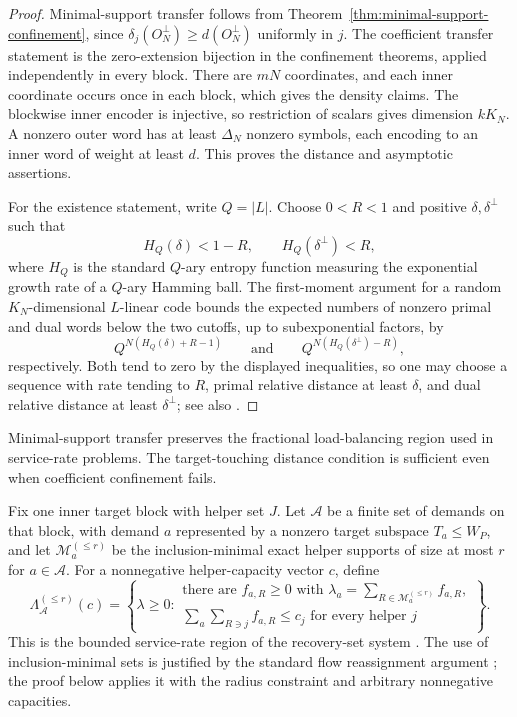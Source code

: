 \begin{proof}
Minimal-support transfer follows from
Theorem~\ref{thm:minimal-support-confinement}, since
$\delta_j(O_N^\perp)\geq d(O_N^\perp)$ uniformly in $j$.
The coefficient transfer statement is the zero-extension bijection in the confinement
theorems, applied independently in every block.  There are $mN$ coordinates,
and each inner coordinate occurs once in each block, which gives the density
claims.  The blockwise inner encoder is injective, so restriction of scalars
gives dimension $kK_N$.  A nonzero outer word has at least $\Delta_N$ nonzero
symbols, each encoding to an inner word of weight at least $d$.  This proves
the distance and asymptotic assertions.

For the existence statement, write $Q=|L|$.  Choose $0<R<1$ and positive
$\delta,\delta^\perp$ such that
\[
 H_Q(\delta)<1-R,
 \qquad
 H_Q(\delta^\perp)<R,
\]
where $H_Q$ is the standard $Q$-ary entropy function measuring the exponential
growth rate of a $Q$-ary Hamming ball.  The first-moment argument for a
random $K_N$-dimensional $L$-linear code bounds the expected numbers of
nonzero primal and dual words below the two cutoffs, up to subexponential
factors, by
\[
 Q^{N(H_Q(\delta)+R-1)}
 \qquad\text{and}\qquad
 Q^{N(H_Q(\delta^\perp)-R)},
\]
respectively.  Both tend to zero by the displayed inequalities, so one may
choose a sequence with rate tending to $R$, primal relative distance at least
$\delta$, and dual relative distance at least $\delta^\perp$; see also
\cite[Chapter~17]{MacWilliamsSloane1977}.
%
%
%
\end{proof}

Minimal-support transfer preserves the fractional load-balancing region
used in service-rate problems.  The target-touching distance condition is
sufficient even when coefficient confinement fails.

Fix one inner target block with helper set $J$.  Let $\mathcal A$ be a finite
set of demands on that block, with demand $a$ represented by a nonzero target
subspace $T_a\leq W_P$, and let
$\mathcal M_a^{(\leq r)}$ be the inclusion-minimal exact helper supports of
size at most $r$ for $a\in\mathcal A$.  For a nonnegative helper-capacity
vector $c$, define
\[
 \Lambda_{\mathcal A}^{(\leq r)}(c)=
 \left\{\lambda\geq0:\begin{array}{l}
 \text{there are }f_{a,R}\geq0\text{ with }
 \lambda_a=\sum_{R\in\mathcal M_a^{(\leq r)}}f_{a,R},\\[2pt]
 \displaystyle\sum_a\sum_{R\ni j}f_{a,R}\leq c_j
 \text{ for every helper }j
 \end{array}\right\}.
\]
This is the bounded service-rate region of the recovery-set system
\cite{AktasEtAl2021,AlfaranoEtAl2024,Mazumdar2023,ChoudharyEtAl2026}.
The use of inclusion-minimal sets is justified by the standard flow
reassignment argument \cite[Proposition~3.3]{AlfaranoRavagnaniSoljanin2022};
the proof below applies it with the radius constraint and arbitrary
nonnegative capacities.

